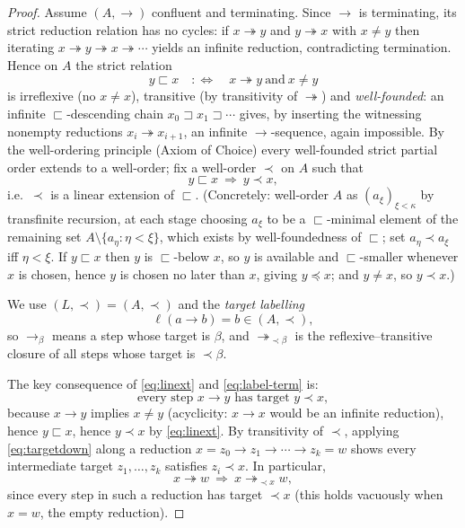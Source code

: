 \documentclass{amsart}
\theoremstyle{definition}
\theoremstyle{remark}
\newcommand{\redto}{\rightarrow}
\newcommand{\redtt}{\twoheadrightarrow}
\begin{document}
\begin{proof}
Assume $(A,\redto)$ confluent and terminating.  Since $\redto$ is terminating,
its strict reduction relation has no cycles: if $x\redtt y$ and $y\redtt x$ with
$x\neq y$ then iterating $x\redtt y\redtt x\redtt\cdots$ yields an infinite
reduction, contradicting termination.  Hence on $A$ the strict relation
\[
   y\sqsubset x \quad:\Longleftrightarrow\quad x\redtt y\ \text{and}\ x\neq y
\]
is irreflexive (no $x\neq x$), transitive (by transitivity of $\redtt$) and
\emph{well-founded}: an infinite $\sqsubset$-descending chain
$x_0\sqsupset x_1\sqsupset\cdots$ gives, by inserting the witnessing nonempty
reductions $x_i\redtt x_{i+1}$, an infinite $\redto$-sequence, again impossible.
By the well-ordering principle (Axiom of Choice) every well-founded strict
partial order extends to a well-order; fix a well-order $\prec$ on $A$ such that
\begin{equation}\label{eq:linext}
   y\sqsubset x \ \Longrightarrow\ y\prec x ,
\end{equation}
i.e.\ $\prec$ is a linear extension of $\sqsubset$.  (Concretely: well-order
$A$ as $(a_\xi)_{\xi<\kappa}$ by transfinite recursion, at each stage choosing
$a_\xi$ to be a $\sqsubset$-minimal element of the remaining set
$A\setminus\{a_\eta:\eta<\xi\}$, which exists by well-foundedness of
$\sqsubset$; set $a_\eta\prec a_\xi$ iff $\eta<\xi$.  If $y\sqsubset x$ then $y$
is $\sqsubset$-below $x$, so $y$ is available and $\sqsubset$-smaller whenever
$x$ is chosen, hence $y$ is chosen no later than $x$, giving $y\preceq x$; and
$y\neq x$, so $y\prec x$.)

We use $(L,\prec)=(A,\prec)$ and the \emph{target labelling}
\begin{equation}\label{eq:label-term}
   \ell(a\redto b)=b\in(A,\prec),
\end{equation}
so $\redto_\beta$ means a step whose target is $\beta$, and
$\redtt_{\prec\beta}$ is the reflexive--transitive closure of all steps whose
target is $\prec\beta$.

The key consequence of \eqref{eq:linext} and \eqref{eq:label-term} is:
\begin{equation}\label{eq:targetdown}
   \text{every step } x\redto y \text{ has target } y\prec x ,
\end{equation}
because $x\redto y$ implies $x\neq y$ (acyclicity: $x\redto x$ would be an
infinite reduction), hence $y\sqsubset x$, hence $y\prec x$ by \eqref{eq:linext}.
By transitivity of $\prec$, applying \eqref{eq:targetdown} along a reduction
$x=z_0\redto z_1\redto\cdots\redto z_k=w$ shows every intermediate target
$z_1,\dots,z_k$ satisfies $z_i\prec x$.  In particular,
\begin{equation}\label{eq:reduct-down}
   x\redtt w \ \Longrightarrow\ x\redtt_{\prec x} w ,
\end{equation}
since every step in such a reduction has target $\prec x$ (this holds vacuously
when $x=w$, the empty reduction).


\end{proof}
\end{document}
